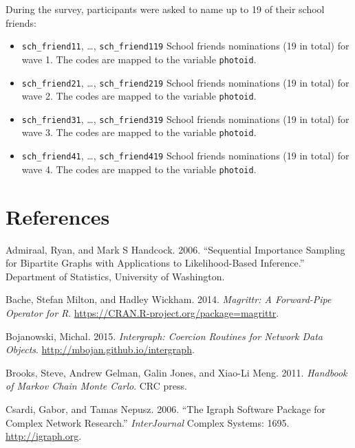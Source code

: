 \documentclass[]{book}
\begin{document}
During the survey, participants were asked to name up to 19 of their school
friends:

\begin{itemize}
\item
  \texttt{sch\_friend11}, \ldots{}, \texttt{sch\_friend119} School friends nominations (19 in total)
  for wave 1. The codes are mapped to the variable \texttt{photoid}.
\item
  \texttt{sch\_friend21}, \ldots{}, \texttt{sch\_friend219} School friends nominations (19 in total)
  for wave 2. The codes are mapped to the variable \texttt{photoid}.
\item
  \texttt{sch\_friend31}, \ldots{}, \texttt{sch\_friend319} School friends nominations (19 in total)
  for wave 3. The codes are mapped to the variable \texttt{photoid}.
\item
  \texttt{sch\_friend41}, \ldots{}, \texttt{sch\_friend419} School friends nominations (19 in total)
  for wave 4. The codes are mapped to the variable \texttt{photoid}.
\end{itemize}



\hypertarget{references}{%
\chapter*{References}\label{references}}

\hypertarget{refs}{}
\leavevmode\hypertarget{ref-admiraal2006}{}%
Admiraal, Ryan, and Mark S Handcock. 2006. ``Sequential Importance Sampling for Bipartite Graphs with Applications to Likelihood-Based Inference.'' Department of Statistics, University of Washington.

\leavevmode\hypertarget{ref-R-magrittr}{}%
Bache, Stefan Milton, and Hadley Wickham. 2014. \emph{Magrittr: A Forward-Pipe Operator for R}. \url{https://CRAN.R-project.org/package=magrittr}.

\leavevmode\hypertarget{ref-R-intergraph}{}%
Bojanowski, Michal. 2015. \emph{Intergraph: Coercion Routines for Network Data Objects}. \url{http://mbojan.github.io/intergraph}.

\leavevmode\hypertarget{ref-brooks2011}{}%
Brooks, Steve, Andrew Gelman, Galin Jones, and Xiao-Li Meng. 2011. \emph{Handbook of Markov Chain Monte Carlo}. CRC press.

\leavevmode\hypertarget{ref-R-igraph}{}%
Csardi, Gabor, and Tamas Nepusz. 2006. ``The Igraph Software Package for Complex Network Research.'' \emph{InterJournal} Complex Systems: 1695. \url{http://igraph.org}.
\end{document}
